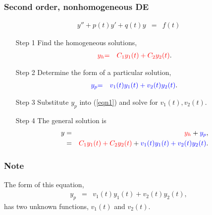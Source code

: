 \begin{frame}
  \frametitle{Second order, nonhomogeneous DE}
  \vspace{-1cm}
  \begin{eqnarray}\label{eqn1}
    y'' + p(t) y' + q(t) y & = & f(t)
  \end{eqnarray}
  \begin{itemize}
  \item[Step 1] Find the homogeneous solutions,
    \begin{eqnarray*}
      {\color{red}y_h} & {\color{red}=} & {\color{red}C_1 y_1(t) + C_2 y_2(t)}.
    \end{eqnarray*}
  \item[Step 2] Determine the form of a particular solution,
    \begin{eqnarray*}
      {\color{blue}y_p} & {\color{blue}=} & {\color{blue}v_1(t) y_1(t) + v_2(t) y_2(t)}.
    \end{eqnarray*}
  \item[Step 3] Substitute $y_p$ into (\ref{eqn1}) and solve  for $v_1(t), v_2(t)$.
  \item[Step 4] The general solution is
    \begin{eqnarray*}
      y & = & {\color{red}y_h}+{\color{blue}y_p}, \\
        & = & {\color{red}C_1 y_1(t) + C_2 y_2(t)} + {\color{blue}v_1(t) y_1(t) + v_2(t) y_2(t)}.
    \end{eqnarray*}

  \end{itemize}

\end{frame}


\begin{frame}
  \frametitle{Note}

  The form of this equation,
  \begin{eqnarray*}
    y_p & = & v_1(t) y_1(t) + v_2(t) y_2(t),
  \end{eqnarray*}
  has two unknown functions, $v_1(t)$ and $v_2(t)$.

  \vfill


  \vfill


  \vfill

\end{frame}


